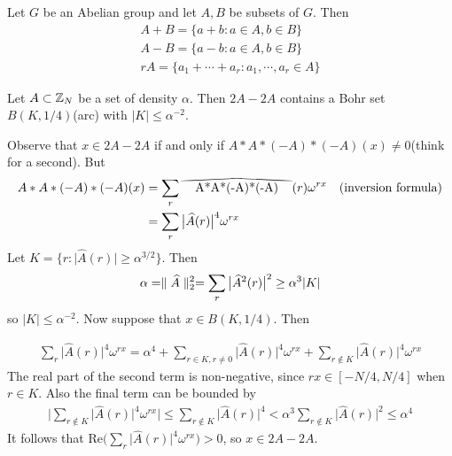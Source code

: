 \documentclass[10pt,a4paper]{report}
\newcommand\reallywidehat[1]{%
\savestack{\tmpbox}{\stretchto{%
  \scaleto{%
    \scalerel*[\widthof{\ensuremath{#1}}]{\kern-.6pt\bigwedge\kern-.6pt}%
    {\rule[-\textheight/2]{1ex}{\textheight}}%
  }{\textheight}%
}{0.5ex}}%
\stackon[1pt]{#1}{\tmpbox}%
}
\renewcommand{\hat}{\widehat}
\newenvironment{proof}
{\begin{changemargin}{1cm}{0.5cm}
	}%
	{\end{changemargin}
}
\begin{document}
 Let $G$ be an Abelian group and let $A,B$ be subsets of $G$. Then 
\begin{align*}
A+B = \{ a+b: a\in A, b\in B\} \\
A-B = \{a-b: a\in A, b\in B\} \\
rA = \{a_1+ \cdots + a_r : a_1,\cdots,a_r \in A  \}
\end{align*}
\s

 Let $A\subset \mathbb{Z}_N$ be a set of density $\alpha$. Then $2A-2A$ contains a Bohr set $B(K,1/4)$(arc) with $|K|\leq \alpha^{-2}$.

\begin{proof}
\pf Observe that $x\in 2A-2A$ if and only if $A*A*(-A)*(-A)(x) \neq 0$(think for a second). But
\begin{align*}
A*A*(-A)*(-A)(x) &= \sum_{r} \reallywidehat{A*A*(-A)*(-A)}(r) \omega^{rx} \quad \text{(inversion formula)} \\
&= \sum_r  \big| \hat{A}(r) \big|^4 \omega^{rx}
\end{align*}
Let $K = \{r: \big| \hat{A}(r) \big| \geq \alpha^{3/2} \}$. Then 
\begin{align*}
\alpha = \norms{\hat{A}}{2}^2 = \sum_{r} \big| \hat{A}^2(r) \big|^2 \geq \alpha^3 |K|
\end{align*}
so $|K| \leq \alpha^{-2}$.
\quad Now suppose that $x\in B(K,1/4)$. Then 

\begin{align*}
\sum_{r} \big| \hat{A}(r)\big|^4 \omega^{rx}  = \alpha^4 + \sum_{r\in K,r\neq 0} \big| \hat{A}(r)\big|^4 \omega^{rx} + \sum_{r \notin K} \big| \hat{A}(r)\big|^4 \omega^{rx}
\end{align*}
The real part of the second term is non-negative, since $rx\in [-N/4,N/4]$ when $r\in K$. Also the final term can be bounded by
\begin{align*}
\Big| \sum_{r \notin K} \big| \hat{A}(r)\big|^4 \omega^{rx} \Big| \leq \sum_{r \notin K} \big| \hat{A}(r)\big|^4 < \alpha^3 \sum_{r \notin K} \big| \hat{A}(r)\big|^2 \leq \alpha^4
\end{align*}
It follows that $\text{Re}\Big( \sum_r  \big| \hat{A}(r) \big|^4 \omega^{rx} \Big) >0$, so $x\in 2A-2A$.

\eop
\end{proof}
\s
\end{document}
